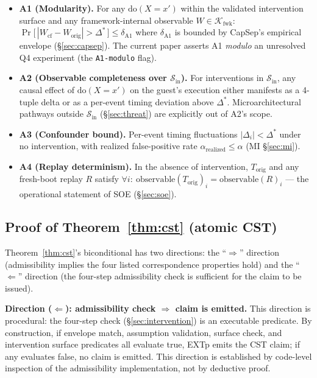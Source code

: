 \documentclass[conference]{IEEEtran}
\newcommand{\Korig}{T_\text{orig}}
\newcommand{\Kfwk}{\mathcal{K}_\text{fwk}}
\newcommand{\Dstar}{\Delta^{*}}
\newcommand{\arealized}{\alpha_\text{realized}}
\newcommand{\dox}[1]{\text{do}(X{=}#1)}
\begin{document}
\begin{itemize}[itemsep=2pt,topsep=2pt,leftmargin=*]
\item \textbf{A1 (Modularity).} For any $\dox{x'}$ within the
  validated intervention surface and any framework-internal
  observable $W \in \Kfwk$:
  $\Pr\big[\,|W_{\text{cf}} - W_{\text{orig}}| > \Dstar\,\big] \leq \delta_{\text{A1}}$
  where $\delta_{\text{A1}}$ is bounded by CapSep's empirical
  envelope (\S\ref{sec:capsep}). The current paper asserts A1
  \emph{modulo} an unresolved Q4 experiment (the
  \texttt{A1-modulo} flag).
\item \textbf{A2 (Observable completeness over $\mathcal{S}_\text{in}$).}
  For interventions in $\mathcal{S}_\text{in}$, any causal effect of
  $\dox{x'}$ on the guest's execution either manifests as a 4-tuple
  delta or as a per-event timing deviation above $\Dstar$.
  Microarchitectural pathways outside $\mathcal{S}_\text{in}$
  (\S\ref{sec:threat}) are explicitly out of A2's scope.
\item \textbf{A3 (Confounder bound).} Per-event timing fluctuations
  $|\Delta_i| < \Dstar$ under no intervention, with realized
  false-positive rate $\arealized \leq \alpha$ (MI \S\ref{sec:mi}).
\item \textbf{A4 (Replay determinism).} In the absence of
  intervention, $\Korig$ and any fresh-boot replay $R$ satisfy
  $\forall i:\ \text{observable}(\Korig)_i = \text{observable}(R)_i$
  --- the operational statement of SOE (\S\ref{sec:soe}).
\end{itemize}

\subsection{Proof of Theorem~\ref{thm:cst} (atomic CST)}

Theorem~\ref{thm:cst}'s biconditional has two directions: the
``$\Rightarrow$'' direction (admissibility implies the four
listed correspondence properties hold) and the
``$\Leftarrow$'' direction (the four-step admissibility check is
sufficient for the claim to be issued).

\textbf{Direction ($\Leftarrow$): admissibility check $\Rightarrow$
claim is emitted.} This direction is procedural: the four-step
check (\S\ref{sec:intervention}) is an executable predicate. By
construction, if envelope match, assumption validation, surface
check, and intervention surface predicates all evaluate true,
EXTp emits the CST claim; if any evaluates false, no claim is
emitted. This direction is established by code-level inspection
of the admissibility implementation, not by deductive proof.
\end{document}
